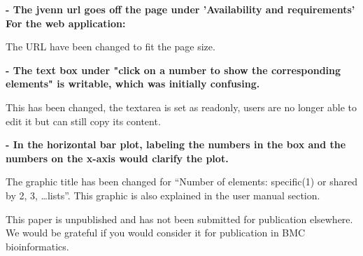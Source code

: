 \documentclass[10pt,stdletter,dateno,sigleft]{newlfm} %
\begin{document}
\begin{newlfm}
\textbf{- The jvenn url goes off the page under 'Availability and requirements'
For the web application:}

The URL have been changed to fit the page size. 

\textbf{- The text box under "click on a number to show the corresponding
elements" is writable, which was initially confusing.}

This has been changed, the textarea is set as readonly, users are no longer able 
to edit it but can still copy its content.

\textbf{- In the horizontal bar plot, labeling the numbers in the box and the
numbers on the x-axis would clarify the plot.}

The graphic title has been changed for ``Number of elements: specific(1) or
shared by 2, 3, \ldots lists''. This graphic is also explained in the
user manual section.


This paper is unpublished and has not been submitted for publication elsewhere. 
We would be grateful if you would consider it for publication in BMC 
bioinformatics.


\end{newlfm}
\end{document}
